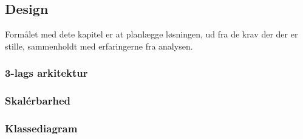 \subsection{Design}

Formålet med dete kapitel er at planlægge løsningen, ud fra de krav der der er
stille, sammenholdt med erfaringerne fra analysen.


\subsubsection{3-lags arkitektur}%
\label{ssub:3_lags_arkiteturen}



\subsubsection{Skalérbarhed}%
\label{ssub:skalerbarhed}


\subsubsection{Klassediagram}%
\label{ssub:klassediagram}


